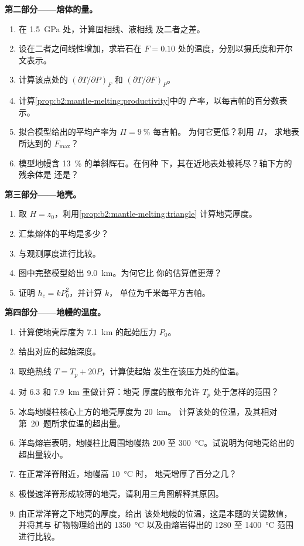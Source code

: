 \begin{problem}
\noindent\textbf{第二部分——熔体的量。}
\begin{enumerate}[resume]
\item 在 \qty{1.5}{GPa} 处，计算固相线、液相线
及二者之差。
\item 设在二者之间线性增加，求岩石在
$F = 0.10$ 处的温度，分别以摄氏度和开尔文表示。
\item 计算该点处的 $(\partial T/\partial P)_F$ 和 $(\partial T/\partial F)_P$。
\item 计算\cref{prop:b2:mantle-melting:productivity}中的
产率，以每吉帕的百分数表示。
\item 拟合模型给出的平均产率为 $\Pi = \qty{9}{\percent}$ 每吉帕。
为何它更低？利用 $\Pi$，
求地表所达到的 $F_{\max}$？
\item 模型地幔含 \qty{13}{\percent} 的单斜辉石。在何种
下，其在近地表处被耗尽？轴下方的残余体是
还是？
\end{enumerate}

\noindent\textbf{第三部分——地壳。}
\begin{enumerate}[resume]
\item 取 $H = z_0$，利用\cref{prop:b2:mantle-melting:triangle}
计算地壳厚度。
\item 汇集熔体的平均是多少？
\item 与观测厚度进行比较。
\item 图中完整模型给出 \qty{9.0}{km}。为何它比
你的估算值更薄？
\item 证明 $h_c = k P_0^2$，并计算 $k$，
单位为千米每平方吉帕。
\end{enumerate}

\noindent\textbf{第四部分——地幔的温度。}
\begin{enumerate}[resume]
\item 计算使地壳厚度为 \qty{7.1}{km} 的起始压力 $P_0$。
\item 给出对应的起始深度。
\item 取绝热线 $T = T_p + 20P$，计算使起始
发生在该压力处的位温。
\item 对 6.3 和 \qty{7.9}{km} 重做计算：地壳
厚度的散布允许 $T_p$ 处于怎样的范围？
\item 冰岛地幔柱核心上方的地壳厚度为 \qty{20}{km}。
计算该处的位温，及其相对第~20~题所求位温的超出量。
\item 洋岛熔岩表明，地幔柱比周围地幔热
200 至 \qty{300}{\celsius}。试说明为何地壳给出的超出量较小。
\item 在正常洋脊附近，地幔高 \qty{10}{\celsius} 时，
地壳增厚了百分之几？
\item 极慢速洋脊形成较薄的地壳，请利用三角图解释其原因。
\item 由正常洋脊之下地壳的厚度，给出
该处地幔的位温，这是本题的关键数值，并将其与
矿物物理给出的 \qty{1350}{\celsius} 以及由熔岩得出的 1280 至
\qty{1400}{\celsius} 范围进行比较。
\end{enumerate}
\end{problem}
